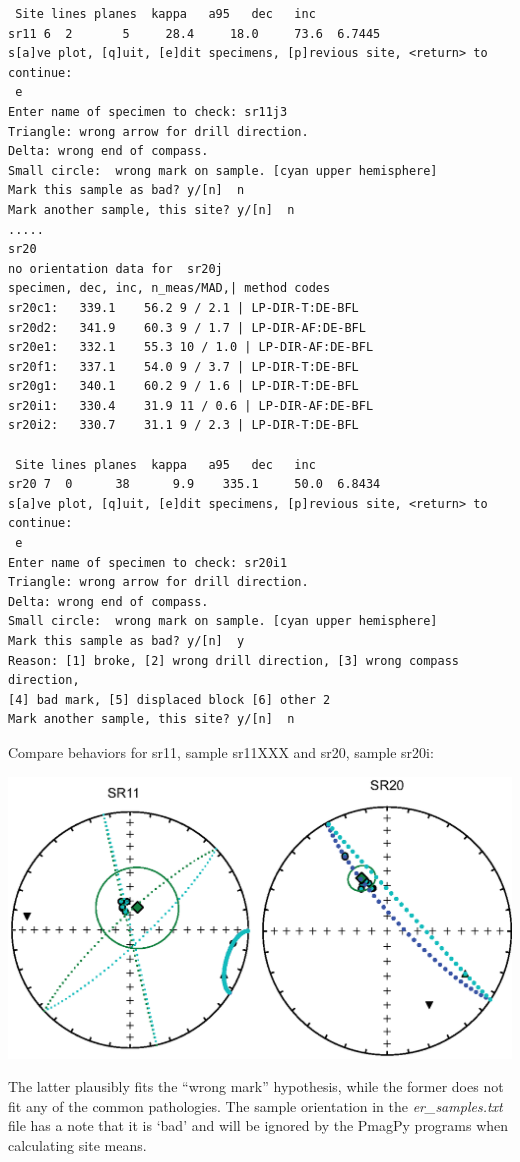 \documentclass[11pt]{book}
\begin{document}
{\begin{verbatim}
 Site lines planes  kappa   a95   dec   inc
sr11 6  2       5     28.4     18.0     73.6  6.7445
s[a]ve plot, [q]uit, [e]dit specimens, [p]revious site, <return> to continue:
 e
Enter name of specimen to check: sr11j3
Triangle: wrong arrow for drill direction.
Delta: wrong end of compass.
Small circle:  wrong mark on sample. [cyan upper hemisphere]
Mark this sample as bad? y/[n]  n
Mark another sample, this site? y/[n]  n
.....
sr20
no orientation data for  sr20j
specimen, dec, inc, n_meas/MAD,| method codes
sr20c1:   339.1    56.2 9 / 2.1 | LP-DIR-T:DE-BFL
sr20d2:   341.9    60.3 9 / 1.7 | LP-DIR-AF:DE-BFL
sr20e1:   332.1    55.3 10 / 1.0 | LP-DIR-AF:DE-BFL
sr20f1:   337.1    54.0 9 / 3.7 | LP-DIR-T:DE-BFL
sr20g1:   340.1    60.2 9 / 1.6 | LP-DIR-T:DE-BFL
sr20i1:   330.4    31.9 11 / 0.6 | LP-DIR-AF:DE-BFL
sr20i2:   330.7    31.1 9 / 2.3 | LP-DIR-T:DE-BFL

 Site lines planes  kappa   a95   dec   inc
sr20 7  0      38      9.9    335.1     50.0  6.8434
s[a]ve plot, [q]uit, [e]dit specimens, [p]revious site, <return> to continue:
 e
Enter name of specimen to check: sr20i1
Triangle: wrong arrow for drill direction.
Delta: wrong end of compass.
Small circle:  wrong mark on sample. [cyan upper hemisphere]
Mark this sample as bad? y/[n]  y
Reason: [1] broke, [2] wrong drill direction, [3] wrong compass direction,
[4] bad mark, [5] displaced block [6] other 2
Mark another sample, this site? y/[n]  n
\end{verbatim}


Compare behaviors for sr11, sample sr11XXX and sr20, sample sr20i:

\includegraphics[width=15cm]{EPSfiles/site_edit_magic.eps}

  The latter plausibly fits the ``wrong mark'' hypothesis, while the former does not fit any of the common pathologies.  The sample orientation in the {\it er\_samples.txt} file has a note that it is `bad' and will be ignored by the PmagPy programs when calculating site means.




}
\end{document}
